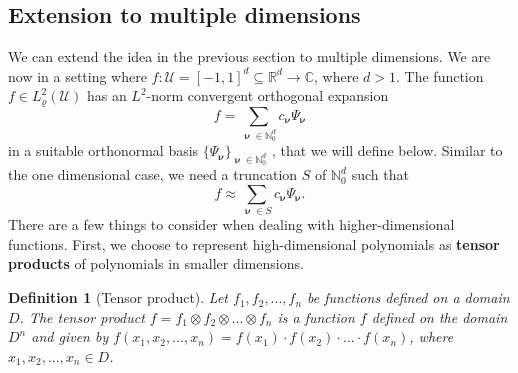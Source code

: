 \documentclass[12pt, oneside]{report}   	%
\newcommand{\R}{\mathbb{R}}
\newcommand{\C}{\mathbb{C}}
\newcommand{\N}{\mathbb{N}}
\newtheorem{defn}{Definition}
\DeclareMathOperator{\nuu}{\boldsymbol{\nu}}
\begin{document}
\subsection{Extension to multiple dimensions}
\label{subsec:multid}

We can extend the idea in the previous section to multiple dimensions. We are now in a setting where $f:\mathcal{U}=[-1,1]^d\subseteq\R^d\to\C$, where $d>1$. The function $f\in L_{\varrho}^2(\mathcal{U})$ has an $L^2$-norm convergent orthogonal expansion
$$
f = \sum_{\nuu\in\N_0^d} c_{\nuu} \Psi_{\nuu}
$$
in a suitable orthonormal basis $\{\Psi_{\nuu}\}_{\nuu\in\N_0^d}$ \cite{sparsepoly}, that we will define below. Similar to the one dimensional case, we need a truncation $S$ of $\N_0^d$ such that
$$
f\approx\sum_{\nuu\in S}c_{\nuu}\Psi_{\nuu}.
$$
There are a few things to consider when dealing with higher-dimensional functions. First, we choose to represent high-dimensional polynomials as \textbf{tensor products} of polynomials in smaller dimensions.

\begin{defn}[Tensor product]
Let $f_1,f_2,...,f_n$ be functions defined on a domain $D$. The tensor product $f=f_1\otimes f_2\otimes ...\otimes f_n$ is a function $f$ defined on the domain $D^n$ and given by $f(x_1,x_2,...,x_n) = f(x_1)\cdot f(x_2)\cdot ...\cdot f(x_n)$, where $x_1,x_2,...,x_n\in D$.
\end{defn}
\end{document}
